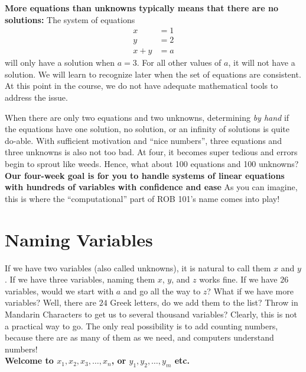 \noindent \textbf{More equations than unknowns typically means that there are no solutions:}
The system of equations
\begin{equation}
\label{eq:SLE:Ex6}
\begin{aligned}
x&=1 \\
y&=2 \\
x+y&=a
\end{aligned}
\end{equation}
will only have a solution when $a=3$. For all other values of $a$, it will not have a solution. We will learn to recognize later when the set of equations are consistent. At this point in the course, we do not have adequate mathematical tools to address the issue.

\vspace*{1cm} 

\begin{tcolorbox}[title=\textbf{\Large Limit of Hand Solutions}]
When there are only two equations and two unknowns, determining \textit{by hand} if the equations have one solution, no solution, or an infinity of solutions is quite do-able. With sufficient motivation and ``nice numbers'', three equations and three unknowns is also not too bad. At four, it becomes super tedious and errors begin to sprout like weeds. Hence, what about 100 equations and 100 unknowns? \textbf{Our four-week goal is for you to handle systems of linear equations with hundreds of variables with confidence and ease} As you can imagine, this is where the ``computational'' part of ROB 101's name comes into play!
\end{tcolorbox}

\section{Naming Variables}

If we have two variables (also called unknowns), it is natural to call them $x$ and $y$. If we have three variables, naming them $x$, $y$, and $z$ works fine. If we have $26$ variables, would we start with $a$ and go all the way to $z$? What if we have more variables? Well, there are $24$ Greek letters, do we add them to the list? Throw in Mandarin Characters to get us to several thousand variables? Clearly, this is not a practical way to go. The only real possibility is to add counting numbers, because there are as many of them as we need, and computers understand numbers!\\

\textbf{Welcome to $x_1, x_2, x_3, \ldots, x_n$, or $y_1, y_2, \ldots, y_m$ etc.}

